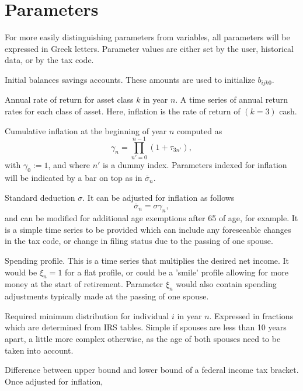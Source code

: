 \documentclass{article}[fleqn,12pt]
\begin{document}
\section{Parameters}
For more easily distinguishing parameters from variables, all parameters will be expressed in Greek letters.
Parameter values are either set by the user, historical data, or by the tax code.
\begin{description}[leftmargin=4em,style=multiline]
\item [$\beta{ijk}$]
	Initial balances savings accounts. These amounts are used to initialize $b_{ijk0}$.
\item [$\tau_{kn}$]
	Annual rate of return for asset class $k$ in year $n$.
	A time series of annual return rates for each class of asset.
	Here, inflation is the rate of return of $(k=3)$ cash.
\item [$\gamma_n$]
	Cumulative inflation at the beginning of year $n$ computed as
	\begin{equation}
		\gamma_n = \prod_{n' = 0}^{n-1} (1 + \tau_{3n'}),
	\end{equation}
	with $\gamma_0 := 1$, and where $n'$ is a dummy index.
	Parameters indexed for inflation will be indicated by a bar on top as in $\bar\sigma_n$.
\item [$\sigma_n$]
	Standard deduction $\sigma$. It can be adjusted for inflation as follows
	\begin{equation}
		\bar\sigma_n = \sigma \gamma_n,
	\end{equation}
	and can be modified for additional age exemptions after 65 of age, for example.
	It is a simple time series to be provided
	which can include any foreseeable changes in the tax code, or change in filing status due to the
	passing of one spouse.
\item [$\xi_{n}$]
	Spending profile. This is a time series that multiplies the desired net income. It would be $\xi_n =1$ for
	a flat profile, or could be a 'smile' profile allowing for more money at the start of retirement. Parameter
	$\xi_n$ would also contain spending adjustments typically made at the passing of one spouse.
\item [$\rho_{in}$]
	Required minimum distribution for individual $i$ in year $n$. Expressed in fractions
	which are determined from IRS tables. Simple if spouses are less than 10 years apart,
	a little more complex otherwise, as the age of both spouses need to be taken into account.
\item [$\Delta_{t n}$]
	Difference between upper bound and lower bound of a federal income tax bracket. Once adjusted for inflation,

\end{description}
\end{document}
